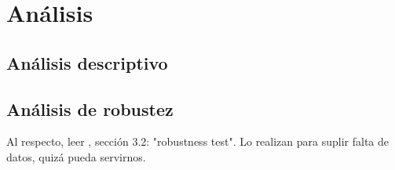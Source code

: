 \section{Análisis}\label{section5} 


\subsection{Análisis descriptivo}

\subsection{Análisis de robustez}

Al respecto, leer \cite{tochkov_2021}, sección 3.2: "robustness test". Lo realizan para suplir falta de datos, quizá pueda servirnos.

